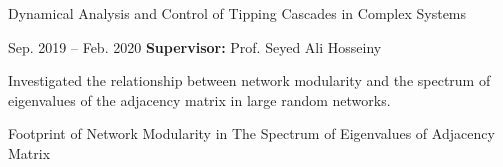 \documentclass[9pt, purple]{./template/cv} %
\begin{document}
\begin{entrylist}
{		%

	}
	{Dynamical Analysis and Control of Tipping Cascades in Complex Systems}

        \entry
	{Sep. 2019 -- Feb. 2020}
	{
         \textbf{Supervisor:} Prof. Seyed Ali Hosseiny \\
        }
	{}
	{
		\begin{minipage}[t]{0.80\textwidth} %
			\vspace{-\baselineskip}
			\itemmarker Investigated the relationship between network modularity and the spectrum of eigenvalues of the adjacency matrix in large random networks.\\
		\end{minipage}

	}
	{Footprint of Network Modularity in The Spectrum of Eigenvalues of Adjacency Matrix}
 

\end{entrylist}
\end{document}
